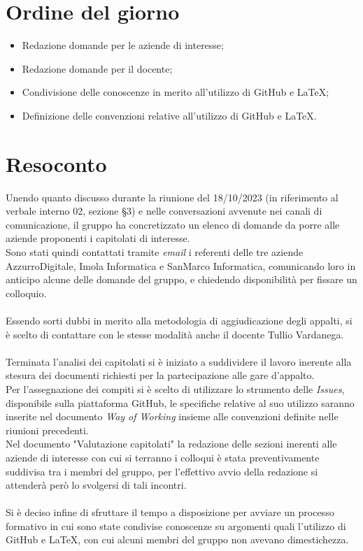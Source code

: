 \section{Ordine del giorno}
\begin{itemize}
    \item Redazione domande per le aziende di interesse;
    \item Redazione domande per il docente;
    \item Condivisione delle conoscenze in merito all'utilizzo di GitHub e LaTeX;
    \item Definizione delle convenzioni relative all'utilizzo di GitHub e LaTeX.
\end{itemize}

\section{Resoconto}
Unendo quanto discusso durante la riunione del 18/10/2023 (in riferimento al verbale interno 02, sezione \S3) e nelle conversazioni avvenute nei canali di comunicazione, il gruppo ha concretizzato un elenco di domande da porre alle aziende proponenti i capitolati di interesse.\\
\noindent
Sono stati quindi contattati tramite \textit{email} i referenti delle tre aziende AzzurroDigitale, Imola Informatica e SanMarco Informatica, comunicando loro in anticipo alcune delle domande del gruppo, e chiedendo disponibilità per fissare un colloquio.\\
\noindent
\\
Essendo sorti dubbi in merito alla metodologia di aggiudicazione degli appalti, si è scelto di contattare con le stesse modalità anche il docente Tullio Vardanega.\\
\noindent
\\
Terminata l'analisi dei capitolati si è iniziato a suddividere il lavoro inerente alla stesura dei documenti richiesti per la partecipazione alle gare d'appalto.\\
\noindent
Per l'assegnazione dei compiti si è scelto di utilizzare lo strumento delle \textit{Issues}, disponibile sulla piattaforma GitHub, le specifiche relative al suo utilizzo saranno inserite nel documento \textit{Way of Working} insieme alle convenzioni definite nelle riunioni precedenti.\\
\noindent
Nel documento "Valutazione capitolati" la redazione delle sezioni inerenti alle aziende di interesse con cui si terranno i colloqui è stata preventivamente suddivisa tra i membri del gruppo, per l'effettivo avvio della redazione si attenderà però lo svolgersi di tali incontri.\\
\noindent
\\
Si è deciso infine di sfruttare il tempo a disposizione per avviare un processo formativo in cui sono state condivise conoscenze su argomenti quali l'utilizzo di GitHub e LaTeX, con cui alcuni membri del gruppo non avevano dimestichezza.

